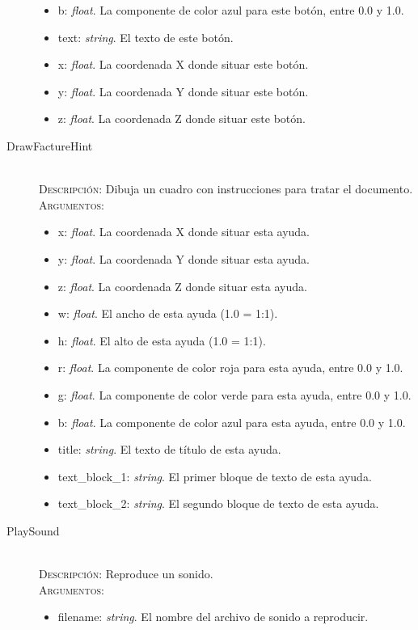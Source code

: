 \begin{description}
\begin{itemize}
  \item b: \textit{float}. La componente de color azul para este botón, entre 0.0 y
    1.0.
  \item text: \textit{string}. El texto de este botón.
  \item x: \textit{float}. La coordenada X donde situar este botón.
  \item y: \textit{float}. La coordenada Y donde situar este botón.
  \item z: \textit{float}. La coordenada Z donde situar este botón.
  \end{itemize}
\item[DrawFactureHint] \hfill \\
  \textsc{Descripción:} Dibuja un cuadro con instrucciones para tratar el documento. \\
  \textsc{Argumentos:}
  \begin{itemize}
  \item x: \textit{float}. La coordenada X donde situar esta ayuda.
  \item y: \textit{float}. La coordenada Y donde situar esta ayuda.
  \item z: \textit{float}. La coordenada Z donde situar esta ayuda.
  \item w: \textit{float}. El ancho de esta ayuda (1.0 = 1:1).
  \item h: \textit{float}. El alto de esta ayuda (1.0 = 1:1).
  \item r: \textit{float}. La componente de color roja para esta ayuda, entre 0.0 y 1.0.
  \item g: \textit{float}. La componente de color verde para esta ayuda, entre 0.0 y 1.0.
  \item b: \textit{float}. La componente de color azul para esta ayuda, entre 0.0 y
    1.0.
  \item title: \textit{string}. El texto de título de esta ayuda.
  \item text\_block\_1: \textit{string}. El primer bloque de texto de esta ayuda.
  \item text\_block\_2: \textit{string}. El segundo bloque de texto de esta ayuda.
  \end{itemize}
\item[PlaySound] \hfill \\
  \textsc{Descripción:} Reproduce un sonido. \\
  \textsc{Argumentos:}
  \begin{itemize}
  \item filename: \textit{string}. El nombre del archivo de sonido a reproducir.

\end{itemize}
\end{description}
